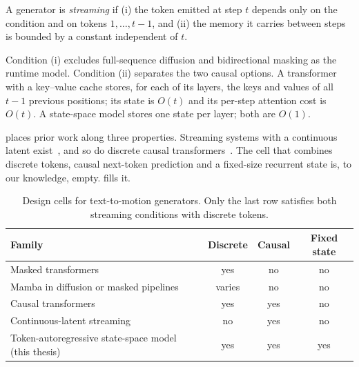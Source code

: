 \begin{df}
A generator is \emph{streaming} if (i) the token emitted at step $t$ depends only on the condition and on tokens $1,\dots,t-1$, and (ii) the memory it carries between steps is bounded by a constant independent of $t$.
\end{df}

Condition (i) excludes full-sequence diffusion and bidirectional masking as the runtime model. Condition (ii) separates the two causal options. A transformer with a key--value cache stores, for each of its layers, the keys and values of all $t-1$ previous positions; its state is $O(t)$ and its per-step attention cost is $O(t)$. A state-space model stores one state per layer; both are $O(1)$.

 places prior work along three properties. Streaming systems with a continuous latent exist~\cite{xiao2025motionstreamer,li2026llamo}, and so do discrete causal transformers~\cite{zhang2023t2mgpt,fu2024mogo}. The cell that combines discrete tokens, causal next-token prediction and a fixed-size recurrent state is, to our knowledge, empty.  fills it.

\begin{table}[H]
\centering
\caption{Design cells for text-to-motion generators. Only the last row satisfies both streaming conditions with discrete tokens.}
\label{tab:design_cells}
\begin{tabular}{p{}ccc}
\toprule
Family & Discrete & Causal & Fixed state \\
\midrule
Masked transformers~\cite{guo2024momask,pinyoanuntapong2023mmm,pinyoanuntapong2024bamm} & yes & no & no \\
Mamba in diffusion or masked pipelines~\cite{zhang2024motionmamba,zhang2024kmm,zhan2026t2mmamba} & varies & no & no \\
Causal transformers~\cite{zhang2023t2mgpt,fu2024mogo,zhong2023attt2m} & yes & yes & no \\
Continuous-latent streaming~\cite{xiao2025motionstreamer,li2026llamo} & no & yes & no \\
Token-autoregressive state-space model (this thesis) & yes & yes & yes \\
\bottomrule
\end{tabular}
\end{table}
